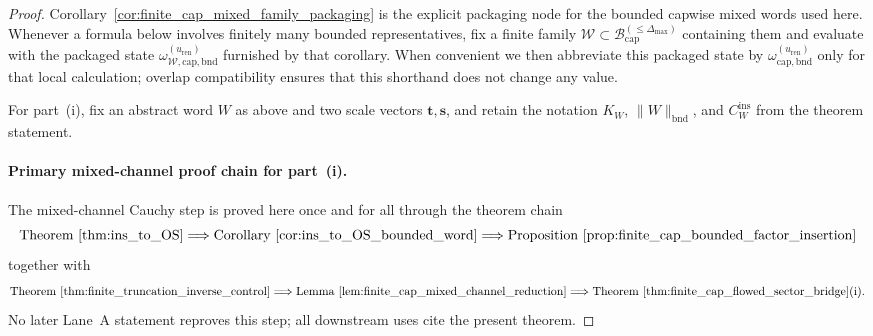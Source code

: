 \begin{proof}
Corollary~\ref{cor:finite_cap_mixed_family_packaging} is the explicit packaging node for the bounded capwise mixed words used here.
Whenever a formula below involves finitely many bounded representatives, fix a finite family $\mathcal W\subset \mathcal B_{\mathrm{cap}}^{(\le \Delta_{\max})}$ containing them and evaluate with the packaged state $\omega_{\mathcal W,\mathrm{cap,bnd}}^{(u_{\mathrm{ren}})}$ furnished by that corollary.
When convenient we then abbreviate this packaged state by $\omega_{\mathrm{cap,bnd}}^{(u_{\mathrm{ren}})}$ only for that local calculation; overlap compatibility ensures that this shorthand does not change any value.

For part~(i), fix an abstract word $W$ as above and two scale vectors $\mathbf t,\mathbf s$, and retain the notation $K_W$, $\|W\|_{\mathrm{bnd}}$, and $C_W^{\mathrm{ins}}$ from the theorem statement.

\paragraph{Primary mixed-channel proof chain for part~(i).}
The mixed-channel Cauchy step is proved here once and for all through the theorem chain
\[
\text{Theorem~\ref{thm:ins_to_OS}}
\Longrightarrow
\text{Corollary~\ref{cor:ins_to_OS_bounded_word}}
\Longrightarrow
\text{Proposition~\ref{prop:finite_cap_bounded_factor_insertion}}
\]
together with
\[
\text{Theorem~\ref{thm:finite_truncation_inverse_control}}
\Longrightarrow
\text{Lemma~\ref{lem:finite_cap_mixed_channel_reduction}}
\Longrightarrow
\text{Theorem~\ref{thm:finite_cap_flowed_sector_bridge}(i)}.
\]
No later Lane~A statement reproves this step; all downstream uses cite the present theorem.


\end{proof}
